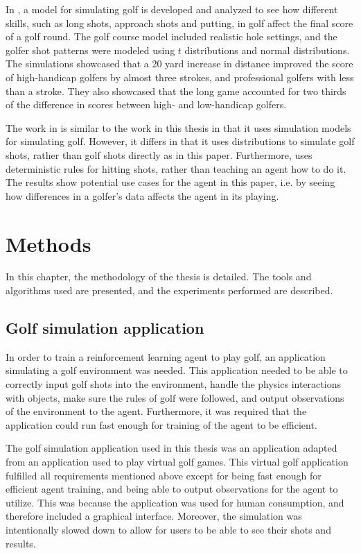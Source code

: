 \documentclass{kththesis}
\begin{document}
In \textcite{ko2012simulation}, a model for simulating golf is developed and analyzed to see how different skills, such as long shots, approach shots and putting, in golf affect the final score of a golf round. The golf course model included realistic hole settings, and the golfer shot patterns were modeled using $t$ distributions and normal distributions. The simulations showcased that a 20 yard increase in distance improved the score of high-handicap golfers by almost three strokes, and professional golfers with less than a stroke. They also showcased that the long game accounted for two thirds of the difference in scores between high- and low-handicap golfers.

The work in \textcite{ko2012simulation} is similar to the work in this thesis in that it uses simulation models for simulating golf. However, it differs in that it uses distributions to simulate golf shots, rather than golf shots directly as in this paper. Furthermore, \textcite{ko2012simulation} uses deterministic rules for hitting shots, rather than teaching an agent how to do it. The results show potential use cases for the agent in this paper, i.e. by seeing how differences in a golfer's data affects the agent in its playing.

\chapter{Methods}
\label{chapter:methods}
In this chapter, the methodology of the thesis is detailed. The tools and algorithms used are presented, and the experiments performed are described. 

\section{Golf simulation application}
In order to train a reinforcement learning agent to play golf, an application simulating a golf environment was needed. This application needed to be able to correctly input golf shots into the environment, handle the physics interactions with objects, make sure the rules of golf were followed, and output observations of the environment to the agent. Furthermore, it was required that the application could run fast enough for training of the agent to be efficient.

The golf simulation application used in this thesis was an application adapted from an application used to play virtual golf games. This virtual golf application fulfilled all requirements mentioned above except for being fast enough for efficient agent training, and being able to output observations for the agent to utilize. This was because the application was used for human consumption, and therefore included a graphical interface. Moreover, the simulation was intentionally slowed down to allow for users to be able to see their shots and results. 
\end{document}
